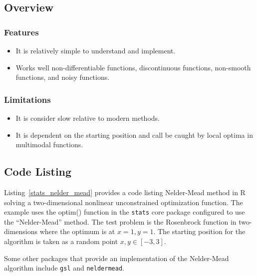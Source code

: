 \subsection{Overview}

\subsubsection{Features}

\begin{itemize}
	\item It is relatively simple to understand and implement.
	\item Works well non-differentiable functions, discontinuous functions, non-smooth functions, and noisy functions.
\end{itemize}

\subsubsection{Limitations}

\begin{itemize}
	\item It is consider slow relative to modern methods.
	\item It is dependent on the starting position and call be caught by local optima in multimodal functions.
\end{itemize}

\subsection{Code Listing}
Listing~\ref{stats_nelder_mead} provides a code listing Nelder-Mead method in R solving a two-dimensional nonlinear unconstrained optimization function.
The example uses the {optim()} function in the \texttt{stats} core package configured to use the ``Nelder-Mead'' method. 
The test problem is the Rosenbrock function in two-dimensions where the optimum is at $x=1, y=1$. The starting position for the algorithm is taken as a random point $x,y \in [-3,3]$.



Some other packages that provide an implementation of the Nelder-Mead algorithm include \texttt{gsl} and \texttt{neldermead}.

